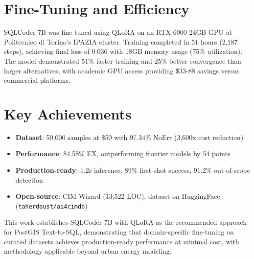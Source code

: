 \documentclass[11pt,a4paper]{article}
\begin{document}
\section{Fine-Tuning and Efficiency}

SQLCoder 7B was fine-tuned using QLoRA on an RTX 6000 24GB GPU at Politecnico di Torino's IPAZIA cluster. Training completed in 51 hours (2,187 steps), achieving final loss of 0.036 with 18GB memory usage (75\% utilization). The model demonstrated 51\% faster training and 25\% better convergence than larger alternatives, with academic GPU access providing \$33-88 savings versus commercial platforms.

\section{Key Achievements}

\begin{itemize}
\item \textbf{Dataset}: 50,000 samples at \$50 with 97.34\% NoErr (3,600x cost reduction)
\item \textbf{Performance}: 84.58\% EX, outperforming frontier models by 54 points
\item \textbf{Production-ready}: 1.2s inference, 89\% first-shot success, 91.2\% out-of-scope detection
\item \textbf{Open-source}: CIM Wizard (13,522 LOC), dataset on HuggingFace (\texttt{taherdoust/ai4cimdb})
\end{itemize}

This work establishes SQLCoder 7B with QLoRA as the recommended approach for PostGIS Text-to-SQL, demonstrating that domain-specific fine-tuning on curated datasets achieves production-ready performance at minimal cost, with methodology applicable beyond urban energy modeling.
\end{document}
